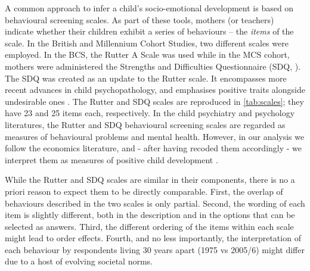 A common approach to infer a child's socio-emotional development is based on behavioural screening scales. As part of these tools, mothers (or teachers) indicate whether their children exhibit a series of behaviours -- the \emph{items} of the scale. In the British and Millennium Cohort Studies, two different scales were employed. In the BCS, the Rutter A Scale was used \citep{Rutter1970} while in the MCS cohort, mothers were  administered the Strengths and Difficulties Questionnaire (SDQ, \citealp{Goodman1994,Goodman1997}). The SDQ was created as an update to the Rutter scale. It encompasses more recent advances in child psychopathology, and emphasises positive traits alongside undesirable ones \citep{Stone2010}. The Rutter and SDQ scales are reproduced in \autoref{tab:scales}; they have 23 and 25 items each, respectively. In the child psychiatry and psychology literatures, the Rutter and SDQ behavioural screening scales are regarded as measures of behavioural problems and mental health. However, in our analysis we follow the economics literature, and - after having recoded them accordingly - we interpret them as measures of positive child development \citep{Goodman2011}.

While the Rutter and SDQ scales are similar in their components, there is no a priori reason to expect them to be directly comparable. First, the overlap of behaviours described in the two scales is only partial. Second, the wording of each item is slightly different, both in the description and in the options that can be selected as answers. Third, the different ordering of the items within each scale might lead to order effects. Fourth, and no less importantly, the interpretation of each behaviour by respondents living 30 years apart (1975 vs 2005/6) might differ due to a host of evolving societal norms.

